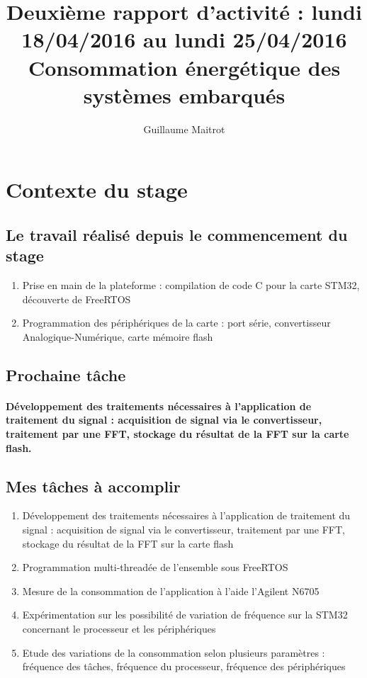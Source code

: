 \documentclass[a4paper]{article}
\title{Deuxième rapport d'activité : lundi 18/04/2016 au lundi 25/04/2016 }
\author{Guillaume Maitrot}
\begin{document}
\maketitle

\begin{center}
\centering
\title{Consommation énergétique des systèmes embarqués}
\end{center}

\section{Contexte du stage}

 \subsection{Le travail réalisé depuis le commencement du stage}
 \begin{enumerate}
\item {Prise en main de la plateforme : compilation de code C pour la carte STM32, découverte de FreeRTOS}
\item {Programmation des périphériques de la carte : port série,
convertisseur Analogique-Numérique, carte mémoire flash}
\end{enumerate}

 \subsection{Prochaine tâche}
    \paragraph{Développement des traitements nécessaires à l'application de
traitement du signal : acquisition de signal via le convertisseur,
traitement par une FFT, stockage du résultat de la FFT sur la carte
flash.}
    
\subsection{Mes tâches à accomplir}
\begin{enumerate}
\item {Développement des traitements nécessaires à l'application de
traitement du signal : acquisition de signal via le convertisseur,
traitement par une FFT, stockage du résultat de la FFT sur la carte
flash}
\item { Programmation multi-threadée de l'ensemble sous FreeRTOS}
\item {Mesure de la consommation de l'application à l'aide l'Agilent
N6705}
\item {Expérimentation sur les possibilité de variation de fréquence sur la
STM32 concernant le processeur et les périphériques}
\item {Etude des variations de la consommation selon plusieurs paramètres :
fréquence des tâches, fréquence du processeur, fréquence des
périphériques}
\end{enumerate}
\end{document}
